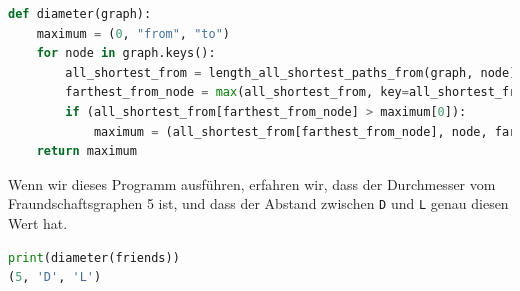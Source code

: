 \begin{enumerate}[(a)]
\begin{lstlisting}[language=Python, caption={Programm, welches den Durchmesser von einem Graphen bestimmt}]
def diameter(graph):
    maximum = (0, "from", "to")
    for node in graph.keys():
        all_shortest_from = length_all_shortest_paths_from(graph, node)
        farthest_from_node = max(all_shortest_from, key=all_shortest_from.get)
        if (all_shortest_from[farthest_from_node] > maximum[0]):
            maximum = (all_shortest_from[farthest_from_node], node, farthest_from_node)
    return maximum
\end{lstlisting}
Wenn wir dieses Programm ausführen, erfahren wir, dass der Durchmesser vom Fraundschaftsgraphen 5 ist, und dass der Abstand zwischen \texttt{D} und \texttt{L} genau diesen Wert hat.
\begin{lstlisting}[language=Python]
print(diameter(friends))
(5, 'D', 'L')
\end{lstlisting}
\end{enumerate}

